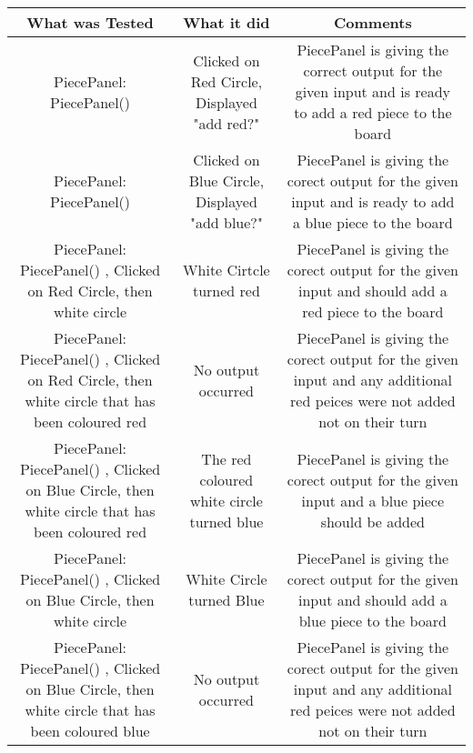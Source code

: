\documentclass[12pt]{article}
\begin{document}
	\begin{tabularx}{\linewidth}{|C|C|C|}
		\hline
		What was Tested & What it did & Comments \\
		\hline 
		PiecePanel: PiecePanel() & Clicked on Red Circle, Displayed "add red?" & PiecePanel is giving the correct output for the given input and is ready to add a red piece to the board \\
		\hline
		PiecePanel: PiecePanel() &  Clicked on Blue Circle, Displayed "add blue?" & PiecePanel is giving the corect output for the given input and is ready to add a blue piece to the board \\
		\hline
		PiecePanel: PiecePanel()  , Clicked on Red Circle, then white circle & White Cirtcle turned red & PiecePanel is giving the corect output for the given input and should add a red piece to the board \\
		\hline
		PiecePanel: PiecePanel()  , Clicked on Red Circle, then white circle that has been coloured red & No output occurred & PiecePanel is giving the corect output for the given input and any additional red peices were not added not on their turn \\
		\hline
		PiecePanel: PiecePanel()  , Clicked on Blue Circle, then white circle that has been coloured red & The red coloured white circle turned blue & PiecePanel is giving the corect output for the given input and a blue piece should be added \\
		\hline
		PiecePanel: PiecePanel()  , Clicked on Blue Circle, then white circle & White Circle turned Blue & PiecePanel is giving the corect output for the given input and should add a blue piece to the board \\
		\hline
		PiecePanel: PiecePanel()  , Clicked on Blue Circle, then white circle that has been coloured blue & No output occurred & PiecePanel is giving the corect output for the given input and any additional red peices were not added not on their turn \\
		\hline
	\end{tabularx}
	\newpage
\end{document}

